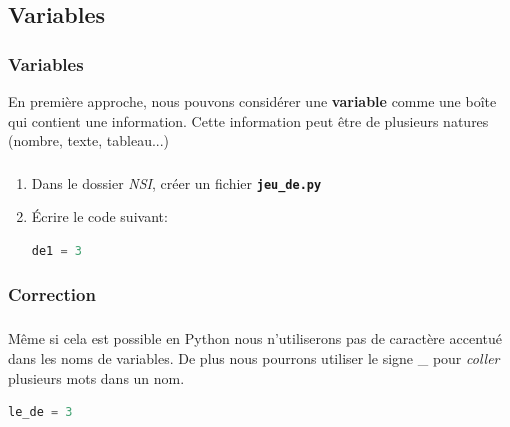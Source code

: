 \documentclass[svgnames,11pt]{beamer}
\begin{document}
\subsection{Variables}
\begin{frame}
    \frametitle{Variables}

    En première approche, nous pouvons considérer une \textbf{variable} comme une boîte qui contient une information. Cette information peut être de plusieurs natures (nombre, texte, tableau...)
\end{frame}
\begin{frame}[fragile]
    \frametitle{}

    \begin{activite}
        \begin{enumerate}
            \item Dans le dossier \emph{NSI}, créer un fichier \textbf{\texttt{jeu\_de.py}}
            \item Écrire le code suivant:
                  \begin{lstlisting}[language=Python , basicstyle=\ttfamily\small, xleftmargin=2em, xrightmargin=2em]
de1 = 3
\end{lstlisting}
        \end{enumerate}

    \end{activite}


\end{frame}
\begin{frame}
    \frametitle{Correction}

    \begin{center}
    \end{center}

\end{frame}
\begin{frame}[fragile]
    \frametitle{}
    \begin{aretenir}[Remarque]
        Même si cela est possible en Python nous n'utiliserons pas de caractère accentué dans les noms de variables. De plus nous pourrons utiliser le signe \_ pour \emph{coller} plusieurs mots dans un nom.
        \begin{lstlisting}[language=Python , basicstyle=\ttfamily\small, xleftmargin=2em, xrightmargin=2em]
le_de = 3
\end{lstlisting}
    \end{aretenir}

\end{frame}
\end{document}

